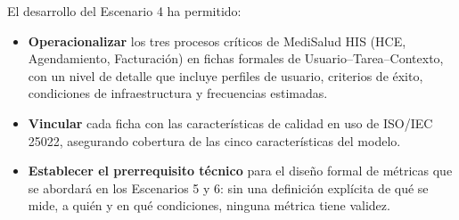 \documentclass[12pt,a4paper]{article}
\begin{document}
\begin{tcolorbox}[colback=green!5, colframe=green!50!black, title=Resultado obtenido]
El desarrollo del Escenario 4 ha permitido:
\begin{itemize}
    \item \textbf{Operacionalizar} los tres procesos cr\'iticos de MediSalud HIS (HCE, Agendamiento, Facturaci\'on) en fichas formales de Usuario--Tarea--Contexto, con un nivel de detalle que incluye perfiles de usuario, criterios de \'exito, condiciones de infraestructura y frecuencias estimadas.
    \item \textbf{Vincular} cada ficha con las caracter\'isticas de calidad en uso de ISO/IEC 25022, asegurando cobertura de las cinco caracter\'isticas del modelo.
    \item \textbf{Establecer el prerrequisito t\'ecnico} para el dise\~no formal de m\'etricas que se abordar\'a en los Escenarios 5 y 6: sin una definici\'on expl\'icita de qu\'e se mide, a qui\'en y en qu\'e condiciones, ninguna m\'etrica tiene validez.
\end{itemize}
\end{tcolorbox}
\end{document}
